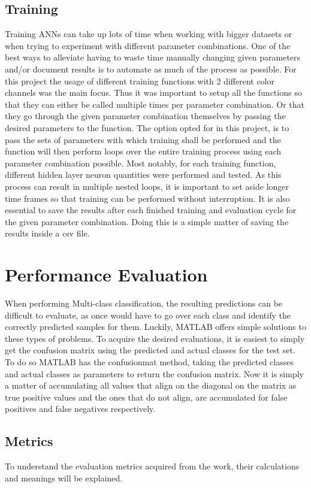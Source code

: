 \subsection{Training}
Training ANNs can take up lots of time when working with bigger datasets or when trying to experiment with different parameter combinations. One of the best ways to alleviate having to waste time manually changing given parameters and/or document results is to automate as much of the process as possible. For this project the usage of different training functions with 2 different color channels was the main focus. Thus it was important to setup all the functions so that they can either be called multiple times per parameter combination. Or that they go through the given parameter combination themselves by passing the desired parameters to the function. The option opted for in this project, is to pass the sets of parameters with which training shall be performed and the function will then perform loops over the entire training process using each parameter combination possible. Most notably, for each training function, different hidden layer neuron quantities were performed and tested. As this process can result in multiple nested loops, it is important to set aside longer time frames so that training can be performed without interruption. It is also essential to save the results after each finished training and evaluation cycle for the given parameter combination. Doing this is a simple matter of saving the results inside a csv file. 

\section{Performance Evaluation}
When performing Multi-class classification, the resulting predictions can be difficult to evaluate, as once would have to go over each class and identify the correctly predicted samples for them. Luckily, MATLAB offers simple solutions to these types of problems. To acquire the desired evaluations, it is easiest to simply get the confusion matrix using the predicted and actual classes for the test set. To do so MATLAB has the confusionmat method, taking the predicted classes and actual classes as parameters to return the confusion matrix. Now it is simply a matter of accumulating all values that align on the diagonal on the matrix as true positive values and the ones that do not align, are accumulated for false positives and false negatives respectively.
\subsection{Metrics}
To understand the evaluation metrics acquired from the work, their calculations and meanings will be explained.
